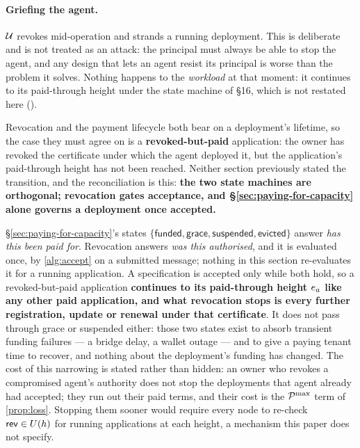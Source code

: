 \paragraph{Griefing the agent.} $\mathcal{U}$ revokes mid-operation and strands a running deployment.
This is deliberate and is not treated as an attack: the principal must always be able to stop the
agent, and any design that lets an agent resist its principal is worse than the problem it solves.
Nothing happens to the \emph{workload} at that moment: it continues to its paid-through height under
the state machine of \S16, which is not restated here ().
\begin{remark}
\label{rem:revoke-vs-lifecycle}
Revocation and the payment lifecycle both bear on a deployment's lifetime, so the case they must agree on is a
\textbf{revoked-but-paid} application: the owner has revoked the certificate under which the agent
deployed it, but the application's paid-through height has not been reached. Neither section
previously stated the transition, and the reconciliation is this: \textbf{the two state machines are
orthogonal; revocation gates acceptance, and \S\ref{sec:paying-for-capacity} alone governs a deployment once accepted.}

\S\ref{sec:paying-for-capacity}'s states $\{\textsf{funded},\textsf{grace},\textsf{suspended},\textsf{evicted}\}$
answer \emph{has this been paid for}. Revocation answers \emph{was this authorised}, and it is evaluated
once, by \cref{alg:accept} on a submitted message; nothing in this section re-evaluates it for a running
application. A specification is accepted only while both hold, so a revoked-but-paid application
\textbf{continues to its paid-through height $e_{a}$ like any other paid application, and what
revocation stops is every further registration, update or renewal under that certificate}. It does not
pass through \textsf{grace} or \textsf{suspended} either: those two states exist to absorb transient
funding failures --- a bridge delay, a wallet outage --- and to give a paying tenant time to recover,
and nothing about the deployment's funding has changed. The cost of this narrowing is stated rather
than hidden: an owner who revokes a compromised agent's authority does not stop the deployments that
agent already had accepted; they run out their paid terms, and their cost is the $\mathcal{P}^{\max}$ term
of \cref{prop:loss}. Stopping them sooner would require every node to re-check
$\mathsf{rev} \in U(h)$ for running applications at each height, a mechanism this paper does not
specify.


\end{remark}
